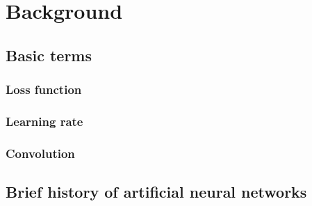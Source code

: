 \chapter{Background}
\label{bg}

\section{Basic terms}
\label{terminology}

\subsection{Loss function}
\label{loss}

\subsection{Learning rate}
\label{rate}

\subsection{Convolution}
\label{loss}

\section{Brief history of artificial neural networks}
\label{history}

